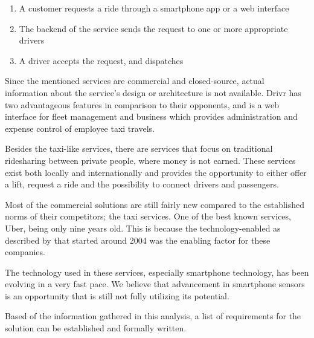 \begin{enumerate}
	\item A customer requests a ride through a smartphone app or a web interface
	\item The backend of the service sends the request to one or more appropriate drivers
	\item A driver accepts the request, and dispatches
\end{enumerate}

Since the mentioned services are commercial and closed-source, actual information about the service's design or architecture is not available.
Drivr has two advantageous features in comparison to their opponents, and is a web interface for fleet management and business which provides administration and expense control of employee taxi travels.

Besides the taxi-like services, there are services that focus on traditional ridesharing between private people, where money is not earned.
These services exist both locally and internationally and provides the opportunity to either offer a lift, request a ride and the possibility to connect drivers and passengers.

Most of the commercial solutions are still fairly new compared to the established norms of their competitors; the taxi services.
One of the best known services, Uber, being only nine years old.
This is because the technology-enabled as described by \citet{doi:10.1080/01441647.2011.621557} that started around 2004 was the enabling factor for these companies.

The technology used in these services, especially smartphone technology, has been evolving in a very fast pace.
We believe that advancement in smartphone sensors is an opportunity that is still not fully utilizing its potential.

Based of the information gathered in this analysis, a list of requirements for the solution can be established and formally written.